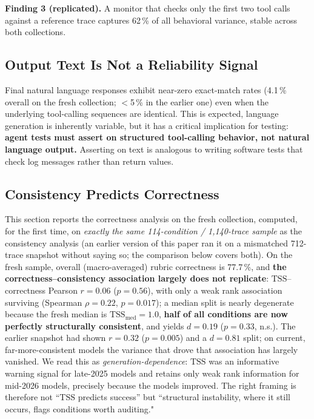 \documentclass[11pt]{article}
\newcommand{\tss}{\mathrm{TSS}}
\newcommand{\finding}[1]{%
  \begin{mdframed}[backgroundcolor=gray!9,linewidth=0.4pt,innertopmargin=4pt,
                   innerbottommargin=4pt]
    \small #1
  \end{mdframed}}
\begin{document}
\finding{\textbf{Finding 3 (replicated).} A monitor that checks only the first two
tool calls against a reference trace captures 62\,\% of all behavioral
variance, stable across both collections.}

\subsection{Output Text Is Not a Reliability Signal}

Final natural language responses exhibit near-zero exact-match rates (4.1\,\%
overall on the fresh collection; $<$5\,\% in the earlier one) even when the
underlying tool-calling sequences are identical. This is
expected, language generation is inherently variable, but it has a critical
implication for testing: \textbf{agent tests must assert on structured tool-calling
behavior, not natural language output.} Asserting on text is analogous to writing
software tests that check log messages rather than return values.

\subsection{Consistency Predicts Correctness}
\label{sec:correctness}

This section reports the correctness analysis on the fresh collection,
computed, for the first time, on \emph{exactly the same 114-condition /
1{,}140-trace sample} as the consistency analysis (an earlier version of this
paper ran it on a mismatched 712-trace snapshot without saying so; the
comparison below covers both). On the fresh sample, overall (macro-averaged)
rubric correctness is 77.7\,\%, and \textbf{the correctness--consistency
association largely does not replicate}: $\tss$--correctness Pearson
$r = 0.06$ ($p = 0.56$), with only a weak rank association surviving
(Spearman $\rho = 0.22$, $p = 0.017$); a median split is nearly degenerate
because the fresh median is $\tss_{\mathrm{med}} = 1.0$, \textbf{half of
all conditions are now perfectly structurally consistent}, and yields
$d = 0.19$ ($p = 0.33$, n.s.). The earlier snapshot had shown $r = 0.32$
($p = 0.005$) and a $d = 0.81$ split; on current, far-more-consistent models
the variance that drove that association has largely vanished. We read this
as \emph{generation-dependence}: $\tss$ was an informative warning signal
for late-2025 models and retains only weak rank information for mid-2026
models, precisely because the models improved. The right framing is therefore
not ``$\tss$ predicts success'' but ``structural instability, where it still
occurs, flags conditions worth auditing."
\end{document}
